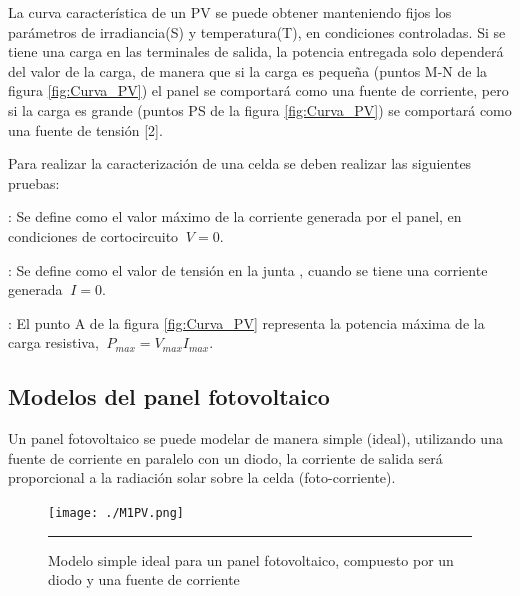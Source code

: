 La curva característica de un PV  se puede obtener manteniendo fijos los parámetros de irradiancia(S) y temperatura(T), en condiciones controladas. Si se tiene una carga en las terminales de salida, la potencia entregada solo dependerá del valor de la carga, de manera que si la carga es pequeña (puntos M-N de la figura \ref{fig:Curva_PV}) el panel se comportará como una fuente de corriente, pero si la carga es grande (puntos PS de la figura \ref{fig:Curva_PV}) se comportará como una fuente de tensión [2]. 

Para realizar la caracterización de una celda se deben realizar las siguientes pruebas: 

\begin{compactitem}

\item {}: Se define como el valor máximo de la corriente generada por el panel, en condiciones de cortocircuito $\ V=0$.


\item {}: Se define como el valor de tensión en la junta , cuando se tiene una corriente generada $\ I=0$.

\item  {}: El punto A de la figura \ref{fig:Curva_PV} representa la potencia máxima de la carga resistiva,  $\ P_{max} = V_{max}I_{max}$.


\end{compactitem}



\subsection{Modelos del panel fotovoltaico}

Un panel fotovoltaico se puede modelar de manera simple (ideal), utilizando una fuente de corriente en paralelo con un diodo, la corriente de salida será proporcional a la radiación solar sobre la celda (foto-corriente). 

\begin{figure}[H]
  \centering
    \texttt{[image: ./M1PV.png]}
    \rule{35em}{0.5pt}
  \caption[Modelo simple ideal para un panel fotovoltaico, compuesto por un diodo y una fuente de corriente]{ Modelo simple ideal para un panel fotovoltaico, compuesto por un diodo y una fuente de corriente}
  \label{fig:Modelo1_PV}
\end{figure}

